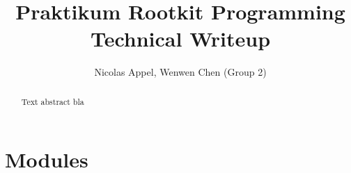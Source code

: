 \documentclass[DIV11,10pt]{scrreprt}
\title{Praktikum Rootkit Programming\\Technical Writeup}
\author{Nicolas Appel, Wenwen Chen (Group 2)}
\begin{document}
\maketitle
\begin{abstract}
Text abstract bla
\end{abstract}
\tableofcontents
\clearpage

\chapter{Modules}



%

\end{document}
